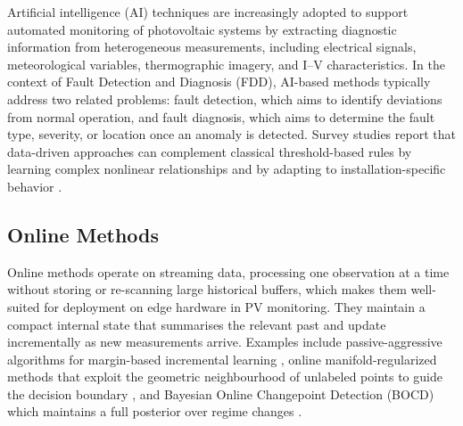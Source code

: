 Artificial intelligence (AI) techniques are increasingly adopted to support automated monitoring of photovoltaic systems by extracting diagnostic information from heterogeneous measurements, including electrical signals, meteorological variables, thermographic imagery, and I--V characteristics. In the context of Fault Detection and Diagnosis (FDD), AI-based methods typically address two related problems: fault detection, which aims to identify deviations from normal operation, and fault diagnosis, which aims to determine the fault type, severity, or location once an anomaly is detected. Survey studies report that data-driven approaches can complement classical threshold-based rules by learning complex nonlinear relationships and by adapting to installation-specific behavior \citep{mellit2018artificial,kurukuru2021machine}.


\subsection{Online Methods}
\label{sec:online-methods}

Online methods operate on streaming data, processing one observation at a time without storing or re-scanning large historical buffers, which makes them well-suited for deployment on edge hardware in PV monitoring. They maintain a compact internal state that summarises the relevant past and update incrementally as new measurements arrive. Examples include passive-aggressive algorithms for margin-based incremental learning \citep{crammer2006online}, online manifold-regularized methods that exploit the geometric neighbourhood of unlabeled points to guide the decision boundary \citep{goldberg2011online}, and Bayesian Online Changepoint Detection (BOCD) which maintains a full posterior over regime changes \citep{BayesianOnlineChangepoint2007}.

